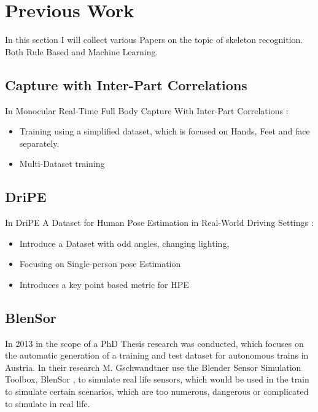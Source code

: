 \section{Previous Work}

In this section I will collect various Papers on the topic of skeleton recognition. Both Rule Based and Machine Learning.

\subsection{Capture with Inter-Part Correlations}

In  Monocular Real-Time Full Body Capture With Inter-Part Correlations \cite{InterPart}:

\begin{itemize}
    \item Training using a simplified dataset, which is focused on Hands, Feet and face separately.
    \item Multi-Dataset training
\end{itemize}

\subsection{DriPE}

In DriPE A Dataset for Human Pose Estimation in Real-World Driving Settings \cite{Dripe}:

\begin{itemize}
    \item Introduce a Dataset with odd angles, changing lighting,
    \item Focusing on Single-person pose Estimation
    \item Introduces a key point based metric for HPE
\end{itemize}

\subsection{BlenSor}

In 2013 in the scope of a PhD Thesis research was conducted\cite{BlenSor-2}, which focuses on the automatic generation of a training and test dataset for autonomous trains in Austria. In their research M. Gschwandtner use the Blender Sensor Simulation Toolbox, BlenSor \cite{BlenSor-1}, to simulate real life sensors, which would be used in the train to simulate certain scenarios, which are too numerous, dangerous or complicated to simulate in real life.